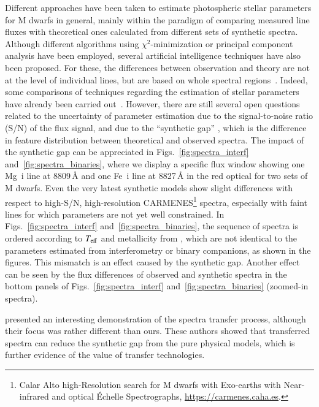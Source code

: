 \documentclass{aa}
\begin{document}
Different approaches have been taken to estimate photospheric stellar parameters for M dwarfs in general, mainly within the paradigm of comparing measured {line fluxes} with theoretical ones calculated {from} different sets of synthetic spectra.
Although different algorithms using $\chi^2$-minimization or principal component analysis have been {employed}, several artificial intelligence techniques have also been proposed.
For these, the differences between observation and theory are not at the level of individual lines, but {are based on whole spectral} regions~\citep{fabbro2018application,kielty2018starnet,bialek2020assessing,minglei2020atmospheric,Passegger2020}. 
Indeed, some comparisons of techniques regarding the estimation of stellar parameters have already been carried out~\citep{Passegger2022}.
However, there are still several open questions related to the uncertainty of parameter estimation {due to} the signal-to-noise ratio (S/N) of the flux signal, and {due to} the {``synthetic gap''} \citep{Fabbro2018,Tabernero2022}, which is the difference in feature distribution between theoretical and observed spectra.
The impact of the synthetic gap can be appreciated in Figs.~\ref{fig:spectra_interf} and~\ref{fig:spectra_binaries}, where we display a specific flux window showing one Mg~{\sc i} line at 8809\,\AA{} and one Fe~{\sc i} line at 8827\,\AA{} in the red optical for two sets of M dwarfs. 
Even the very latest synthetic models show slight differences with respect to high-S/N, high-resolution CARMENES\footnote{Calar Alto high-Resolution search for M dwarfs with Exo-earths with Near-infrared and optical \'Echelle Spectrographs, \url{https://carmenes.caha.es}.} spectra, especially with faint lines for which parameters are not yet well constrained.
In Figs.~\ref{fig:spectra_interf} and~\ref{fig:spectra_binaries}, the sequence of spectra is ordered according to $T_{\rm eff}$ and metallicity from \citet{Schweitzer2019}, which are not identical to the parameters estimated from interferometry or binary companions, as shown in the figures.
This mismatch is an effect caused by the synthetic gap. Another effect can be seen by the flux differences of observed and synthetic spectra in the bottom panels of Figs.~\ref{fig:spectra_interf} and~\ref{fig:spectra_binaries} (zoomed-in spectra).

\citet{o2020interpreting} presented an interesting demonstration of the spectra transfer process, although their focus was rather different than ours. These authors showed that transferred spectra can reduce the synthetic gap from the pure physical models, which is further evidence of the value of transfer technologies.
\end{document}
